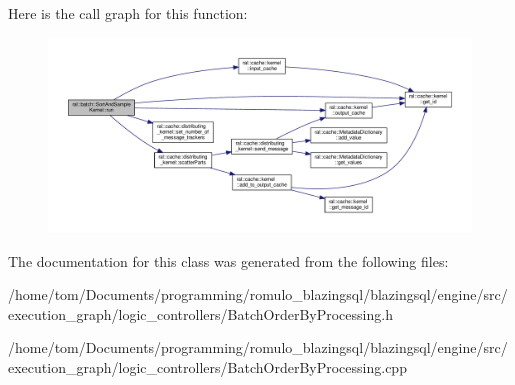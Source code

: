 Here is the call graph for this function\+:\nopagebreak
\begin{figure}[H]
\begin{center}
\leavevmode
\includegraphics[width=350pt]{classral_1_1batch_1_1SortAndSampleKernel_a6e97bc1286a0e8d8273556d56372fa56_cgraph}
\end{center}
\end{figure}


The documentation for this class was generated from the following files\+:\begin{DoxyCompactItemize}
\item 
/home/tom/\+Documents/programming/romulo\+\_\+blazingsql/blazingsql/engine/src/execution\+\_\+graph/logic\+\_\+controllers/Batch\+Order\+By\+Processing.\+h\item 
/home/tom/\+Documents/programming/romulo\+\_\+blazingsql/blazingsql/engine/src/execution\+\_\+graph/logic\+\_\+controllers/Batch\+Order\+By\+Processing.\+cpp\end{DoxyCompactItemize}
